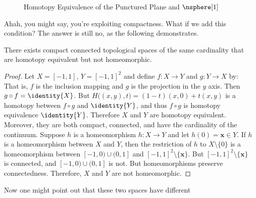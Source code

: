 \documentclass[oneside]{book}                                                  %
\begin{document}
                \begin{figure}[H]
                    \captionsetup{type=figure}
                    \centering
                    
                    \caption{%
                        Homotopy Equivalence of the Punctured Plane and
                        $\nsphere[1]$%
                    }
                    \label{fig:HE_punc_plane_and_circle}
                \end{figure}
                Ahah, you might say, you're exploiting compactness. What if we
                add this condition? The answer is still no, as the following
                demonstrates.
                \begin{theorem}
                    There exists compact connected topological spaces of the
                    same cardinality that are homotopy equivalent but not
                    homeomorphic.
                \end{theorem}
                \begin{proof}
                    Let $X=[-1,1]$, $Y=[-1,1]^{2}$ and define
                    $f:X\rightarrow{Y}$ and $g:Y\rightarrow{X}$ by:
                    That is, $f$ is the inclusion mapping and $g$ is the
                    projection in the $y$ axis. Then $g\circ{f}=\identity{X}$.
                    But $H\big((x,y),t\big)=(1-t)(x,0)+t(x,y)$ is a homotopy
                    between $f\circ{g}$ and $\identity{Y}$, and thus
                    $f\circ{g}$ is homotopy equivalence $\identity{Y}$.
                    Therefore $X$ and $Y$ are homotopy equivalent. Moreover,
                    they are both compact, connected, and have the cardinality
                    of the continuum. Suppose $h$ is a homeomorphism
                    $h:X\rightarrow{Y}$ and let $h(0)=\mathbf{x}\in{Y}$. If $h$
                    is a homeomorphism between $X$ and $Y$, then the restriction
                    of $h$ to $X\setminus\{0\}$ is a homeomorphism between
                    $[-1,0)\cup(0,1]$ and $[-1,1]^{2}\setminus\{\mathbf{x}\}$.
                    But $[-1,1]^{2}\setminus\{\mathbf{x}\}$ is connected, and
                    $[-1,0)\cup(0,1]$ is not. But homeomorphisms preserve
                    connectedness. Therefore, $X$ and $Y$ are not homeomorphic.
                \end{proof}
                Now one might point out that these two spaces have different
\end{document}
